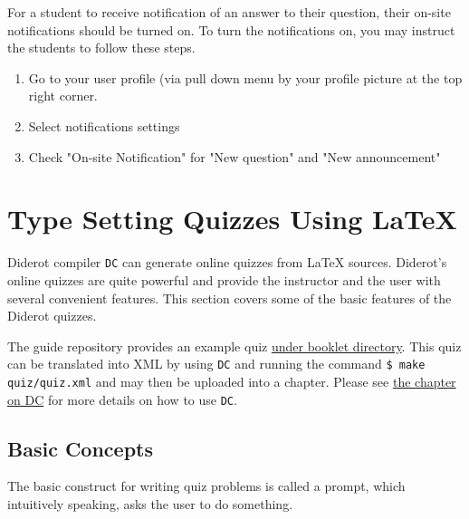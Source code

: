 \begin{gram} 
For a student to receive notification of an answer to their question,
their on-site notifications should be turned on.  
%
To turn the notifications on, you may instruct the students to follow
these steps.
\begin{enumerate}
\item  Go to your user profile (via pull down menu by your profile picture at the top right corner. 

\item Select notifications settings

\item Check "On-site Notification" for "New question" and "New announcement"
\end{enumerate}
\end{gram}



\section{Type Setting Quizzes Using LaTeX}
\label{ch:quiz::typesetting}

\begin{gram}
Diderot compiler \lstinline`DC` can generate online quizzes from LaTeX sources. Diderot’s online quizzes are quite powerful and provide the instructor and the user with several convenient features. This section covers some of the basic features of the Diderot quizzes.  

The guide repository provides an example quiz 
\href{https://github.com/diderot-edu/diderot-guide/tree/master/booklet}{under booklet directory}. 
%
This quiz can be translated into XML by using \lstinline`DC` and running the command 
%
\lstinline`$ make quiz/quiz.xml`
%
and may then be uploaded into a chapter. 
%
Please see \href{ch:dc}{the chapter on DC} for more details on how to use \lstinline`DC`.
\end{gram}

\subsection{Basic Concepts}
The basic construct for writing quiz problems is called a  prompt, which intuitively speaking, asks the user to do something.


